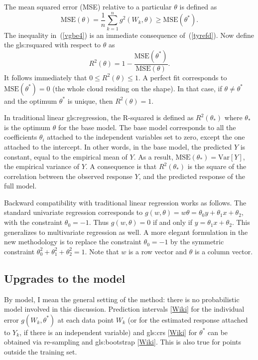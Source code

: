 \documentclass[oneside,10pt]{book}
\begin{document}
\noindent The \textcolor{index}{mean squared error} (MSE) relative to a particular $\theta$ is defined as  
\begin{equation}
\text{MSE}(\theta)=\frac{1}{n}\sum_{k=1}^n g^2(W_k,\theta) \geq \text{MSE}(\theta^*). \label{vgbe4} 
\end{equation}
The inequality in~(\ref{vgbe4})  is an immediate consequence of~(\ref{tyrefd}). Now define the 
\gls{gls:rsquared}
 with respect to 
 $\theta$ as 
\begin{equation}
R^2(\theta)=1 - \frac{\text{MSE}(\theta^*)}{\text{MSE}(\theta)}. \label{rsqwa}
\end{equation}
It follows immediately that $0\leq R^2(\theta)\leq 1$. A perfect fit corresponds to $\text{MSE}(\theta^*)=0$ (the whole cloud residing on the shape). In that case,  if $\theta\neq \theta^*$ and the optimum $\theta^*$ is unique, then $R^2(\theta)=1$.

In traditional linear \gls{gls:regression}, the R-squared is defined as $R^2(\theta_*)$ where $\theta_*$ is the optimum $\theta$ for the base model. 
The base model corresponds to all the coefficients $\theta_i$ attached to the independent variables set to zero, except the one attached to the intercept. In other words, in the base model, the predicted $Y$ is constant, equal to the empirical mean of $Y$. As a result,  $\text{MSE}(\theta_*)=\text{Var}[Y]$, the empirical variance of $Y$. A consequence is that $R^2(\theta_*)$ is the square of the
 correlation between the observed response $Y$, and the predicted response of the full model. 


Backward compatibility with traditional linear regression works as follows. The standard univariate regression corresponds to 
$g(w,\theta) = w \theta =\theta_0 y +\theta_1 x + \theta_2$, with the constraint $\theta_0=-1$.  Thus $g(w,\theta)=0$ if and only if
 $y= \theta_1 x + \theta_2$. This generalizes to multivariate regression as well.
A more elegant formulation in the new methodology is to replace the constraint $\theta_0=-1$ by the symmetric constraint $\theta_0^2+\theta_1^2+\theta_2^2=1$. 
 Note that $w$ is a row vector and $\theta$ is a column vector. 

\subsection{Upgrades to the model}

By model, I mean the general setting of the method: there is no probabilistic model involved in this discussion. 
\textcolor{index}{Prediction intervals} [\href{https://en.wikipedia.org/wiki/Prediction_interval}{Wiki}] for the individual error $g(W_k,\theta^*)$ at each data point $W_k$ (or for the estimated response attached to $Y_k$, if there is an independent variable) and 
 \glspl{gls:cr} [\href{https://en.wikipedia.org/wiki/Confidence_region}{Wiki}] for $\theta^*$ can be obtained via re-sampling and \gls{gls:bootstrap} [\href{https://en.wikipedia.org/wiki/Bootstrapping_(statistics)}{Wiki}]. This is also true for points outside the training set. 
\end{document}

